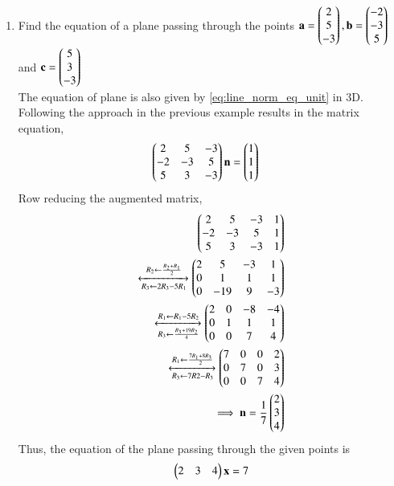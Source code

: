 \renewcommand{\theequation}{\theenumi}
\begin{enumerate}[label=\thesubsection.\arabic*.,ref=\thesubsection.\theenumi]

\item  Find the equation of a plane passing through the points $\mathbf{a}=\begin{pmatrix}2\\5\\-3\end{pmatrix}, \mathbf{b}=\begin{pmatrix}-2\\-3\\5\end{pmatrix}$ and $\mathbf{c}=\begin{pmatrix}5\\3\\-3\end{pmatrix}$ 
\label{eq:plane}
\\
\solution
The equation of  plane is also  given by \eqref{eq:line_norm_eq_unit} in 3D.  Following the approach in the previous example results in the matrix equation, 
\begin{align}
\begin{pmatrix}2&5&-3 \\ -2&-3&5 \\ 5&3&-3\end{pmatrix} \mathbf{n} &= \begin{pmatrix}1\\1\\1\end{pmatrix}
\end{align}
Row reducing the augmented matrix, 
\begin{align}
\begin{pmatrix}2&5&-3 & 1\\ -2&-3&5 & 1\\ 5&3&-3 & 1\end{pmatrix} 
\\
\xleftrightarrow[R_3\leftarrow 2R_3-5R_1]{R_2\leftarrow \frac{R_2+R_1}{2} }\begin{pmatrix}2&5&-3 & 1\\ 0&1&1 & 1\\ 0&-19&9 & -3\end{pmatrix} 
\\
\xleftrightarrow[R_3\leftarrow \frac{R_3+19R_2}{4}]{R_1\leftarrow R_1-5R_2 }\begin{pmatrix}2&0&-8 & -4\\ 0&1&1 & 1\\ 0&0&7 & 4\end{pmatrix}\\ 
\xleftrightarrow[R_3\leftarrow 7R2-R_3]{R_1\leftarrow \frac{7R_1+8R_3}{2} }\begin{pmatrix}7&0&0 & 2\\ 0&7&0 & 3\\ 0&0&7 & 4\end{pmatrix} 
\\
\implies \mathbf{n} = \frac{1}{7}\begin{pmatrix}2\\3\\4\end{pmatrix}
\end{align}
Thus, the equation of the plane passing through the given points is
%
\begin{align}
\begin{pmatrix}2 & 3 & 4\end{pmatrix}\mathbf{x} = 7
\end{align} 

\end{enumerate}
